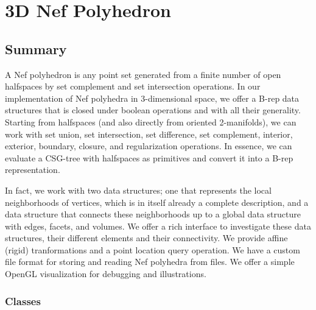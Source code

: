 
\chapter{3D Nef Polyhedron}
\label{chapterNef3Ref}

\section*{Summary}

A Nef polyhedron is any point set generated from a finite number of
open halfspaces by set complement and set intersection operations.  In
our implementation of Nef polyhedra in 3-dimensional space, we offer a
B-rep data structures that is closed under boolean operations and with
all their generality. Starting from halfspaces (and also directly from
oriented 2-manifolds), we can work with set union, set intersection,
set difference, set complement, interior, exterior, boundary, closure,
and regularization operations. In essence, we can evaluate a CSG-tree
with halfspaces as primitives and convert it into a B-rep
representation.

In fact, we work with two data structures; one that represents the
local neighborhoods of vertices, which is in itself already a complete
description, and a data structure that connects these neighborhoods up
to a global data structure with edges, facets, and volumes. We offer a
rich interface to investigate these data structures, their different
elements and their connectivity. We provide affine (rigid)
tranformations and a point location query operation. We have a custom
file format for storing and reading Nef polyhedra from files. We offer
a simple OpenGL visualization for debugging and illustrations.

\subsection*{Classes}

